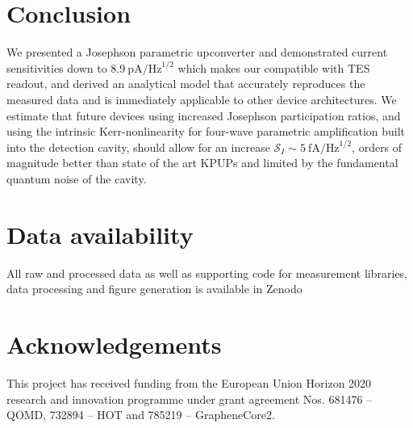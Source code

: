 \section{Conclusion}

We presented a Josephson parametric upconverter and demonstrated current sensitivities down to $\SI{8.9}{\pico\ampere\per\hertz\tothe{1/2}}$ which makes our compatible with TES readout, and derived an analytical model that accurately reproduces the measured data and is immediately applicable to other device architectures.
% 
We estimate that future devices using increased Josephson participation ratios, and using the intrinsic Kerr-nonlinearity for four-wave parametric amplification built into the detection cavity, should allow for an increase $\mathcal{S}_I\sim\SI{5}{\femto\ampere\per\hertz\tothe{1/2}}$, orders of magnitude better than state of the art KPUPs and limited by the fundamental quantum noise of the cavity.


\section*{Data availability}
All raw and processed data as well as supporting code for measurement libraries, data processing and figure generation is available in Zenodo~\cite{schmidtDataProcessingCurrent2020}

\section*{Acknowledgements}
This project has received funding from the European Union Horizon 2020 research and innovation programme under grant agreement Nos. 681476 -- QOMD, 732894 -- HOT and 785219 -- GrapheneCore2.

